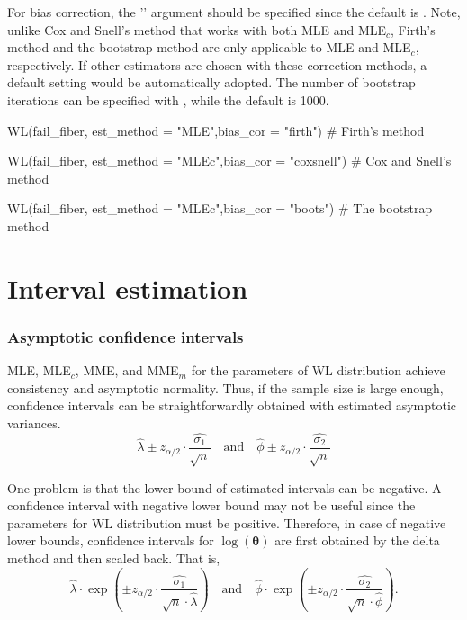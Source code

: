For bias correction, the '' argument should be specified since the default is . Note, unlike Cox and Snell's method that works with both MLE and MLE$_c$, Firth's method and the bootstrap method are only applicable to MLE and MLE$_c$, respectively. If other estimators are chosen with these correction methods, a default setting would be automatically adopted. 
The number of bootstrap iterations can be specified with , while the default is 1000.
\begin{example}
	WL(fail_fiber, est_method = "MLE",bias_cor = "firth")   # Firth's method
\end{example}
\begin{example}
	WL(fail_fiber, est_method = "MLEc",bias_cor = "coxsnell") # Cox and Snell's method
\end{example}
\begin{example}
	WL(fail_fiber, est_method = "MLEc",bias_cor = "boots") # The bootstrap method
\end{example}





\section{Interval estimation}



\subsubsection{Asymptotic confidence intervals}
MLE, MLE$_{c}$, MME, and MME$_{m}$ for the parameters of WL distribution achieve consistency and asymptotic normality. Thus, if the sample size is large enough, confidence intervals can be straightforwardly obtained with estimated asymptotic variances.
$$ \widehat{\lambda}\pm z_{\alpha/2}\cdot \frac{\widehat{\sigma_{1}}}{\sqrt{n}}\quad\text{and}\quad\widehat{\phi}\pm z_{\alpha/2}\cdot \frac{\widehat{\sigma_{2}}}{\sqrt{n}} $$

One problem is that the lower bound of estimated intervals can be negative. A confidence interval with negative lower bound may not be useful since the parameters for WL distribution must be positive. Therefore, in case of negative lower bounds, confidence intervals for $\log (\boldsymbol{\theta})$ are first obtained by the delta method and then scaled back. That is,
$$\widehat{\lambda}\cdot\operatorname{exp}\left(\pm z_{\alpha/2}\cdot\frac{\widehat{\sigma_{1}}}{\sqrt{n}\cdot\widehat{\lambda}}\right)\quad\text{and} \quad \widehat{\phi}\cdot\operatorname{exp}\left(\pm z_{\alpha/2}\cdot\frac{\widehat{\sigma_{2}}}{\sqrt{n}\cdot\widehat{\phi}}\right).$$




